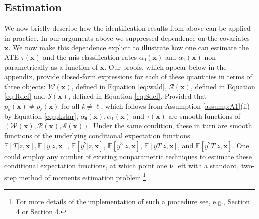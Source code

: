 \subsection{Estimation}
We now briefly describe how the identification results from above can be applied in practice.
In our arguments above we suppressed dependence on the covariates $\mathbf{x}$. 
We now make this dependence explicit to illustrate how one can estimate the ATE $\tau(\mathbf{x})$ and the mis-classification rates $\alpha_0(\mathbf{x})$ and $\alpha_1(\mathbf{x})$ non-parametrically as a function of $\mathbf{x}$.
Our proofs, which appear below in the appendix, provide closed-form expressions for each of these quantities in terms of three objects: $\mathcal{W}(\mathbf{x})$, defined in Equation \ref{eq:wald}, $\mathcal{R}(\mathbf{x})$, defined in Equation \ref{eq:Rdef} and $\mathcal{S}(\mathbf{x})$, defined in Equation \ref{eq:Sdef}.
Provided that $p_k(\mathbf{x}) \neq p_\ell(\mathbf{x})$ for all $k\neq \ell$, which follows from Assumption \ref{assump:A1}(ii) by Equation \ref{eq:pkstar},  $\alpha_0(\mathbf{x}), \alpha_1(\mathbf{x})$ and $\tau(\mathbf{x})$ are smooth functions of $\left(\mathcal{W}(\mathbf{x}), \mathcal{R}(\mathbf{x}), \mathcal{S}(\mathbf{x})\right)$.
Under the same condition, these in turn are smooth functions of  the underlying conditional expectation functions $ \mathbb{E}\left[ T|z,\mathbf{x} \right], \mathbb{E}\left[y| z,\mathbf{x} \right]$, $\mathbb{E}\left[y^2| z,\mathbf{x} \right]$, $\mathbb{E}\left[y^3| z,\mathbf{x} \right]$, $\mathbb{E}\left[yT| z,\mathbf{x} \right]$, and  $\mathbb{E}\left[y^2T| z,\mathbf{x} \right]$.
One could employ any number of existing nonparametric techniques to estimate these conditional expectation functions, at which point one is left with a standard, two-step method of moments estimation problem.\footnote{For more details of the implementation of such a procedure see, e.g., \cite{Mahajan} Section 4 or \cite{Lewbel} Section 4.}
